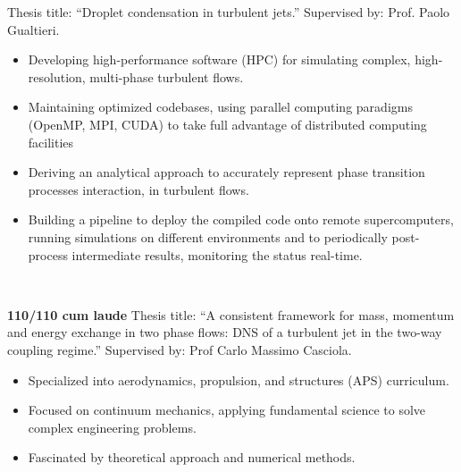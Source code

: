 \bigskip


\iflongversion

	Thesis title: ``Droplet condensation in turbulent jets.'' Supervised by: Prof. Paolo Gualtieri. \\
	\smallskip
	\begin{itemize}
		\item Developing high-performance software (HPC) for simulating complex, high-resolution, multi-phase turbulent flows.
		\item Maintaining optimized codebases, using parallel computing paradigms (OpenMP, MPI, CUDA) to take full advantage of distributed computing facilities
		\item Deriving an analytical approach to accurately represent phase transition processes interaction, in turbulent flows.
		\item Building a pipeline to deploy the compiled code onto remote supercomputers, running simulations on different environments and to periodically post-process intermediate results, monitoring the status real-time.
	\end{itemize}
	\medskip
	\
	\medskip

	\textbf{110/110 cum laude} Thesis title: ``A consistent framework for mass, momentum and energy exchange in two phase flows: DNS of a turbulent jet in the two-way coupling regime.'' Supervised by: Prof Carlo Massimo Casciola. \\
	\smallskip
	\begin{itemize}
		\item Specialized into aerodynamics, propulsion, and structures (APS) curriculum.
		\item Focused on continuum mechanics, applying fundamental science to solve complex engineering problems.
		\item Fascinated by theoretical approach and numerical methods.
	\end{itemize}
	\medskip

	\divider

